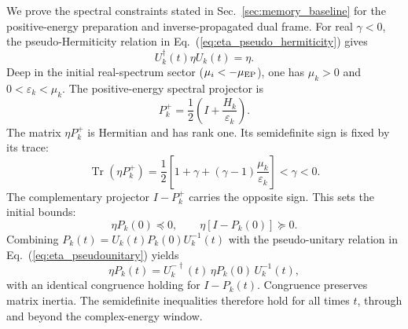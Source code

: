 \documentclass[aps,prb,reprint,superscriptaddress,amsmath,amssymb,floatfix]{revtex4-2}
\begin{document}
  We prove the spectral constraints stated in Sec.~\ref{sec:memory_baseline} for the positive-energy preparation and inverse-propagated dual frame. For real $\gamma<0$, the pseudo-Hermiticity relation in Eq.~(\ref{eq:eta_pseudo_hermiticity}) gives
\begin{equation}
U_k^\dagger(t)\eta U_k(t)=\eta .
\label{eq:eta_pseudounitary}
\end{equation}
Deep in the initial real-spectrum sector ($\mu_i<-\mu_{\rm EP}$), one has $\mu_k>0$ and $0<\varepsilon_k<\mu_k$. The positive-energy spectral projector is
\begin{equation}
P_k^+
=
\frac{1}{2}
\left(
I+\frac{H_k}{\varepsilon_k}
\right).
\label{eq:positive_projector_metric}
\end{equation}
The matrix $\eta P_k^+$ is Hermitian and has rank one. Its semidefinite sign is fixed by its trace:
\begin{equation}
\operatorname{Tr}(\eta P_k^+)
=
\frac{1}{2}
\left[
1+\gamma
+
(\gamma-1)\frac{\mu_k}{\varepsilon_k}
\right]
<\gamma<0 .
\label{eq:left_metric_trace}
\end{equation}
The complementary projector $I-P_k^+$ carries the opposite sign.
This sets the initial bounds:
\begin{equation}
\eta P_k(0)\preceq0,
\qquad
\eta[I-P_k(0)]\succeq0 .
\label{eq:initial_metric_signs}
\end{equation}
Combining $P_k(t)=U_k(t)P_k(0)U_k^{-1}(t)$ with the pseudo-unitary relation in Eq.~(\ref{eq:eta_pseudounitary}) yields
\begin{equation}
\eta P_k(t)
=
U_k^{-\dagger}(t)\,
\eta P_k(0)\,
U_k^{-1}(t),
\label{eq:metric_congruence_P}
\end{equation}
with an identical congruence holding for $I-P_k(t)$. Congruence preserves matrix inertia. The semidefinite inequalities therefore hold for all times $t$, through and beyond the complex-energy window.
\end{document}
